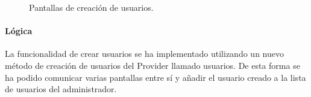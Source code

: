 \begin{figure}[H]%
  \centering
  \qquad
  \caption{Pantallas de creación de usuarios.}%
  \label{fig:creacionusuario}%
\end{figure}



\paragraph*{Lógica}
La funcionalidad de crear usuarios se ha implementado utilizando un nuevo método de creación de usuarios del Provider llamado usuarios. De esta forma
se ha podido comunicar varias pantallas entre sí y añadir el usuario creado a la lista de usuarios del administrador.


